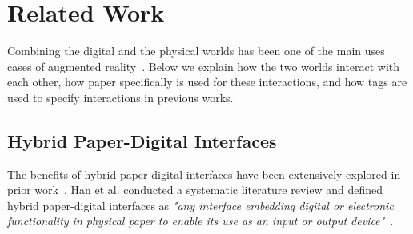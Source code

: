 \section{Related Work}
Combining the digital and the physical worlds has been one of the main uses cases of augmented reality~\cite{dogan_fabricate_2022, dogan_augmented_2024}. %
Below we explain how the two worlds interact with each other, how paper specifically is used for these interactions, %
and how tags are used to specify interactions in previous works.





\subsection{Hybrid Paper-Digital Interfaces}
The benefits of hybrid paper-digital interfaces have been extensively explored in prior work~\cite{rajaram_paper_2022, li_holodoc_2019, alessandrini_audio-augmented_2014, song_penlight_2009}. Han et al. conducted a systematic literature review and defined hybrid paper-digital interfaces as \textit{"any interface embedding digital or electronic functionality in physical paper to enable its use as an input or output device"}~\cite{han_hybrid_2021}.

